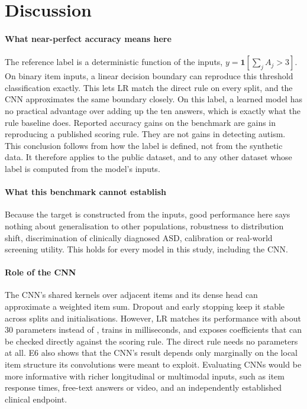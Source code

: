 \documentclass[5p,times,twocolumn]{elsarticle}
\begin{document}
\section{Discussion}
\label{sec:discussion}

\paragraph{What near-perfect accuracy means here}
The reference label is a deterministic function of the inputs, $y=\mathbf{1}[\sum_{j}A_j>3]$. On binary item inputs, a linear decision boundary can reproduce this threshold classification exactly. This lets LR match the direct rule on every split, and the CNN approximates the same boundary closely. On this label, a learned model has no practical advantage over adding up the ten answers, which is exactly what the rule baseline does. Reported accuracy gains on the benchmark are gains in reproducing a published scoring rule. They are not gains in detecting autism. This conclusion follows from how the label is defined, not from the synthetic data. It therefore applies to the public dataset, and to any other dataset whose label is computed from the model's inputs.

\paragraph{What this benchmark cannot establish}
Because the target is constructed from the inputs, good performance here says nothing about generalisation to other populations, robustness to distribution shift, discrimination of clinically diagnosed ASD, calibration or real-world screening utility. This holds for every model in this study, including the CNN.

\paragraph{Role of the CNN}
The CNN's shared kernels over adjacent items and its dense head can approximate a weighted item sum. Dropout and early stopping keep it stable across splits and initialisations. However, LR matches its performance with about 30 parameters instead of \CNNParams, trains in milliseconds, and exposes coefficients that can be checked directly against the scoring rule. The direct rule needs no parameters at all. E6 also shows that the CNN's result depends only marginally on the local item structure its convolutions were meant to exploit. Evaluating CNNs would be more informative with richer longitudinal or multimodal inputs, such as item response times, free-text answers or video, and an independently established clinical endpoint.
\end{document}
